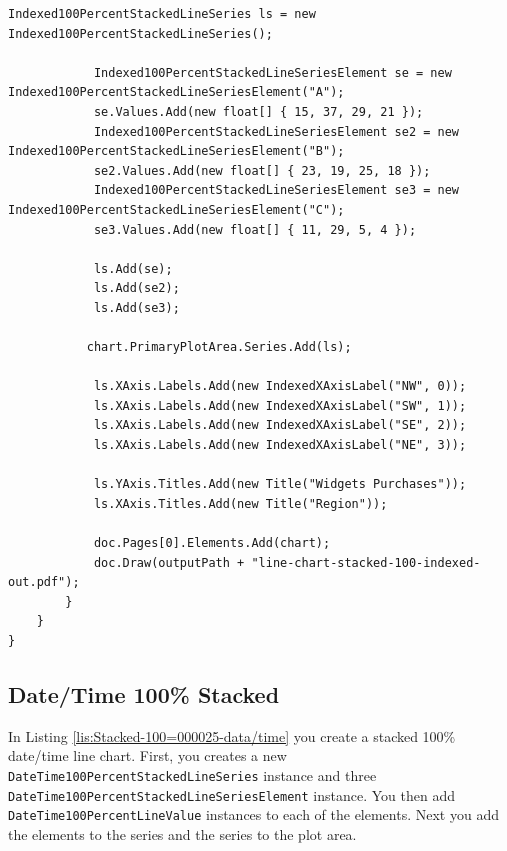 \documentclass[american]{tufte-book}
\numberwithin{equation}{section}
\numberwithin{figure}{section}
\begin{document}
{\begin{lstlisting}[caption={Stacked 100\% indexed line chart.},label={lis:line-Stacked-100=000025-indexed},basicstyle={\footnotesize\ttfamily},breaklines=true]
            Indexed100PercentStackedLineSeries ls = new Indexed100PercentStackedLineSeries();

            Indexed100PercentStackedLineSeriesElement se = new Indexed100PercentStackedLineSeriesElement("A");
            se.Values.Add(new float[] { 15, 37, 29, 21 });
            Indexed100PercentStackedLineSeriesElement se2 = new Indexed100PercentStackedLineSeriesElement("B");
            se2.Values.Add(new float[] { 23, 19, 25, 18 });
            Indexed100PercentStackedLineSeriesElement se3 = new Indexed100PercentStackedLineSeriesElement("C");
            se3.Values.Add(new float[] { 11, 29, 5, 4 });

            ls.Add(se);
            ls.Add(se2);
            ls.Add(se3);
                        
           chart.PrimaryPlotArea.Series.Add(ls);

            ls.XAxis.Labels.Add(new IndexedXAxisLabel("NW", 0));
            ls.XAxis.Labels.Add(new IndexedXAxisLabel("SW", 1));
            ls.XAxis.Labels.Add(new IndexedXAxisLabel("SE", 2));
            ls.XAxis.Labels.Add(new IndexedXAxisLabel("NE", 3));

            ls.YAxis.Titles.Add(new Title("Widgets Purchases"));
            ls.XAxis.Titles.Add(new Title("Region"));

            doc.Pages[0].Elements.Add(chart);
            doc.Draw(outputPath + "line-chart-stacked-100-indexed-out.pdf");
        }
    }
}
\end{lstlisting}
\leavevmode\egroup

\subsection{Date/Time 100\% Stacked}

In Listing \ref{lis:Stacked-100=000025-data/time} you create a stacked
100\% date/time line chart. First, you creates a new \texttt{DateTime100PercentStackedLineSeries}
instance and three \texttt{DateTime100PercentStackedLineSeriesElement}
instance. You then add \texttt{DateTime100PercentLineValue} instances
to each of the elements. Next you add the elements to the series and
the series to the plot area.

}
\end{document}
